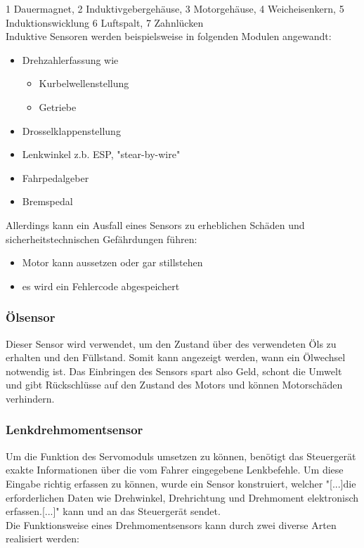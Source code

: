 \documentclass{article}
\begin{document}
				\begin{flushleft}
					1 Dauermagnet, 2 Induktivgebergehäuse, 3 Motorgehäuse, 4 Weicheisenkern, 5 Induktionswicklung 6 Luftspalt, 7 Zahnlücken\\
					
					Induktive Sensoren werden beispielsweise in folgenden Modulen angewandt:
					
					\begin{itemize}
						\item Drehzahlerfassung wie
							\begin{itemize}
								\item Kurbelwellenstellung
								\item Getriebe
							\end{itemize}	
						\item Drosselklappenstellung
						\item Lenkwinkel z.b. ESP, "stear-by-wire"
						\item Fahrpedalgeber
						\item Bremspedal
					\end{itemize}
				
					Allerdings kann ein Ausfall eines Sensors zu erheblichen Schäden und sicherheitstechnischen Gefährdungen führen:
					\begin{itemize}
						\item Motor kann aussetzen oder gar stillstehen
						\item es wird ein Fehlercode abgespeichert
					\end{itemize}	
				\end{flushleft}				
		
			\subsubsection{Ölsensor}
				\begin{flushleft}
					
					Dieser Sensor wird verwendet, um den Zustand über des verwendeten Öls zu erhalten und den Füllstand. Somit kann angezeigt werden, wann ein Ölwechsel notwendig ist. Das Einbringen des Sensors spart also Geld, schont die Umwelt und gibt Rückschlüsse auf den Zustand des Motors und können Motorschäden verhindern.\cite{TS10}

				\end{flushleft}		
		
			\subsubsection{Lenkdrehmomentsensor}
				Um die Funktion des Servomoduls umsetzen zu können, benötigt das Steuergerät exakte Informationen über die vom Fahrer eingegebene Lenkbefehle. Um diese Eingabe richtig erfassen zu können, wurde ein Sensor konstruiert, welcher "[...]die erforderlichen Daten wie Drehwinkel, Drehrichtung und Drehmoment elektronisch erfassen.[...]"\cite{TS11} kann und an das Steuergerät sendet.\\
				Die Funktionsweise eines Drehmomentsensors kann durch zwei diverse Arten realisiert werden:\\
				
\end{document}
